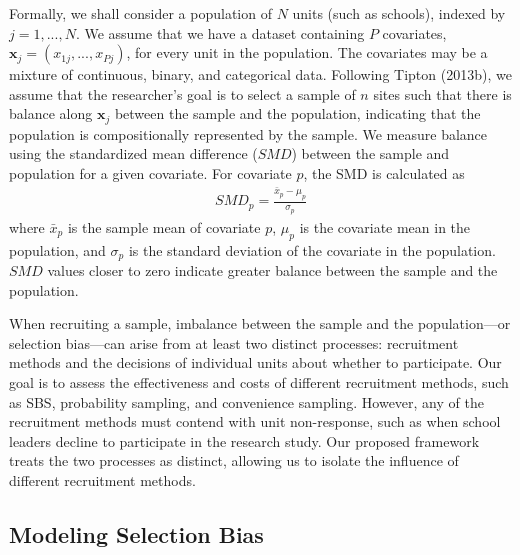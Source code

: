 \documentclass[
  english,
  man,floatsintext]{apa6}
\begin{document}
Formally, we shall consider a population of \(N\) units (such as schools), indexed by \(j = 1,...,N\).
We assume that we have a dataset containing \(P\) covariates, \(\mathbf{x}_j = \left(x_{1j},...,x_{Pj}\right)\), for every unit in the population. The covariates may be a mixture of continuous, binary, and categorical data.
Following Tipton (2013b), we assume that the researcher's goal is to select a sample of \(n\) sites such that there is balance along \(\mathbf{x}_j\) between the sample and the population, indicating that the population is compositionally represented by the sample.
We measure balance using the standardized mean difference (\(SMD\)) between the sample and population for a given covariate. For covariate \(p\), the SMD is calculated as
\begin{align} \label{eq:SMD}
SMD_p = \frac{\bar{x}_p - \mu_p}{\sigma_p}
\end{align}
where \(\bar{x}_p\) is the sample mean of covariate \(p\), \(\mu_p\) is the covariate mean in the population, and \(\sigma_p\) is the standard deviation of the covariate in the population. \(SMD\) values closer to zero indicate greater balance between the sample and the population.

When recruiting a sample, imbalance between the sample and the population---or selection bias---can arise from at least two distinct processes: recruitment methods and the decisions of individual units about whether to participate. Our goal is to assess the effectiveness and costs of different recruitment methods, such as SBS, probability sampling, and convenience sampling. However, any of the recruitment methods must contend with unit non-response, such as when school leaders decline to participate in the research study.
Our proposed framework treats the two processes as distinct, allowing us to isolate the influence of different recruitment methods.

\hypertarget{modeling-selection-bias}{%
\subsection{Modeling Selection Bias}\label{modeling-selection-bias}}
\end{document}
